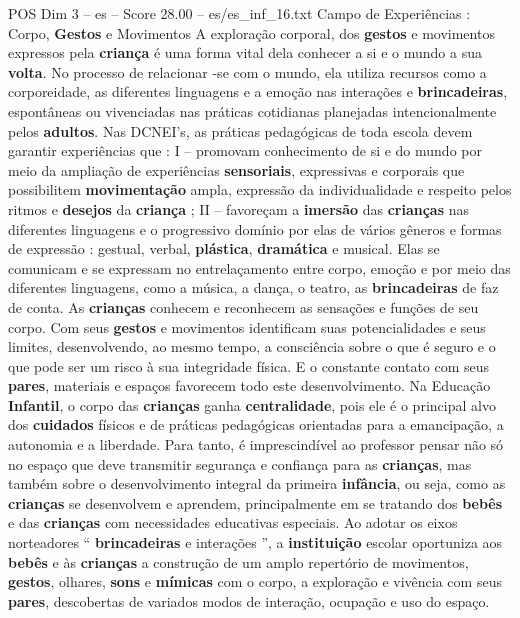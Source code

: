 \begin{textsample}{POS Dim 3 – es – Score 28.00 – es/es\_inf\_16.txt}  \label{ex:f3_pos_111}
Campo de Experiências : Corpo, \textbf{Gestos} e Movimentos A exploração corporal, dos \textbf{gestos} e movimentos expressos pela \textbf{criança} é uma forma vital dela conhecer a si e o mundo a sua \textbf{volta}.
No processo de relacionar -se com o mundo, ela utiliza recursos como a corporeidade, as diferentes linguagens e a emoção nas interações e \textbf{brincadeiras}, espontâneas ou vivenciadas nas práticas cotidianas planejadas intencionalmente pelos \textbf{adultos}.
Nas DCNEI’s, as práticas pedagógicas de toda escola devem garantir experiências que : I – promovam conhecimento de si e do mundo por meio da ampliação de experiências \textbf{sensoriais}, expressivas e corporais que possibilitem \textbf{movimentação} ampla, expressão da individualidade e respeito pelos ritmos e \textbf{desejos} da \textbf{criança} ; II – favoreçam a \textbf{imersão} das \textbf{crianças} nas diferentes linguagens e o progressivo domínio por elas de vários gêneros e formas de expressão : gestual, verbal, \textbf{plástica}, \textbf{dramática} e musical.
Elas se comunicam e se expressam no entrelaçamento entre corpo, emoção e por meio das diferentes linguagens, como a música, a dança, o teatro, as \textbf{brincadeiras} de faz de conta.
As \textbf{crianças} conhecem e reconhecem as sensações e funções de seu corpo.
Com seus \textbf{gestos} e movimentos identificam suas potencialidades e seus limites, desenvolvendo, ao mesmo tempo, a consciência sobre o que é seguro e o que pode ser um risco à sua integridade física.
E o constante contato com seus \textbf{pares}, materiais e espaços favorecem todo este desenvolvimento.
Na Educação \textbf{Infantil}, o corpo das \textbf{crianças} ganha \textbf{centralidade}, pois ele é o principal alvo dos \textbf{cuidados} físicos e de práticas pedagógicas orientadas para a emancipação, a autonomia e a liberdade.
Para tanto, é imprescindível ao professor pensar não só no espaço que deve transmitir segurança e confiança para as \textbf{crianças}, mas também sobre o desenvolvimento integral da primeira \textbf{infância}, ou seja, como as \textbf{crianças} se desenvolvem e aprendem, principalmente em se tratando dos \textbf{bebês} e das \textbf{crianças} com necessidades educativas especiais.
Ao adotar os eixos norteadores “ \textbf{brincadeiras} e interações ”, a \textbf{instituição} escolar oportuniza aos \textbf{bebês} e às \textbf{crianças} a construção de um amplo repertório de movimentos, \textbf{gestos}, olhares, \textbf{sons} e \textbf{mímicas} com o corpo, a exploração e vivência com seus \textbf{pares}, descobertas de variados modos de interação, ocupação e uso do espaço.

\end{textsample}
